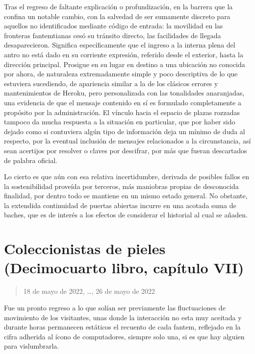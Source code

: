 \documentclass[
]{book}
\begin{document}
Tras el regreso de faltante explicación o profundización, en la barrera que la confina un notable cambio, con la salvedad de ser sumamente discreto para aquellos no identificados mediante código de entrada: la movilidad en las fronteras fantemtianas cesó su tránsito directo, las facilidades de llegada desaparecieron. Significa específicamente que el ingreso a la interna plena del antro no está dado en su corriente expresión, referido desde el exterior, hasta la dirección principal. Prosigue en su lugar en destino a una ubicación no conocida por ahora, de naturaleza extremadamente simple y poco descriptiva de lo que estuviera sucediendo, de apariencia similar a la de los clásicos errores y mantenimientos de Heroku, pero personalizada con las tonalidades anaranjadas, una evidencia de que el mensaje contenido en sí es formulado completamente a propósito por la administración. El vínculo hacia el espacio de plazas rozzadas tampoco da mucha respuesta a la situación en particular, que por haber sido dejado como si contuviera algún tipo de información deja un mínimo de duda al respecto, por la eventual inclusión de mensajes relacionados a la circunstancia, así sean acertijos por resolver o claves por descifrar, por más que fueran descartados de palabra oficial.

Lo cierto es que aún con esa relativa incertidumbre, derivada de posibles fallos en la sostenibilidad proveída por terceros, más maniobras propias de desconocida finalidad, por dentro todo se mantiene en un mismo estado general. No obstante, la extendida continuidad de puertas abiertas incurre en una acotada suma de baches, que es de interés a los efectos de considerar el historial al cual se añaden.

\hypertarget{coleccionistas-de-pieles-decimocuarto-libro-capuxedtulo-vii}{%
\section{Coleccionistas de pieles (Decimocuarto libro, capítulo VII)}\label{coleccionistas-de-pieles-decimocuarto-libro-capuxedtulo-vii}}

\begin{quote}
18 de mayo de 2022, \ldots, 26 de mayo de 2022
\end{quote}

Fue un pronto regreso a lo que solían ser previamente las fluctuaciones de movimiento de los visitantes, unas donde la interacción no esta muy aceitada y durante horas permanecen estáticos el recuento de cada fantem, reflejado en la cifra adherida al ícono de computadores, siempre solo una, si es que hay alguien para vislumbrarla.
\end{document}
